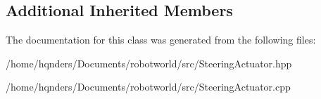 \subsection*{Additional Inherited Members}


The documentation for this class was generated from the following files\+:\begin{DoxyCompactItemize}
\item 
/home/hqnders/\+Documents/robotworld/src/Steering\+Actuator.\+hpp\item 
/home/hqnders/\+Documents/robotworld/src/Steering\+Actuator.\+cpp\end{DoxyCompactItemize}
